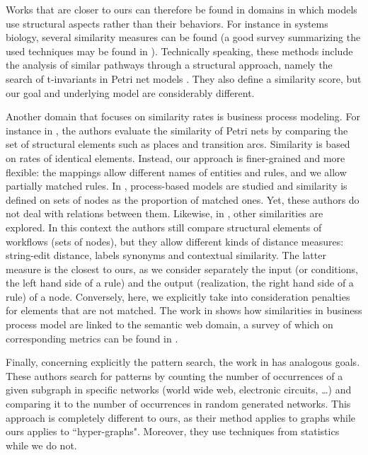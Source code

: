 \documentclass[a4paper,twoside]{article}
\begin{document}
Works that are closer to ours can therefore be found in domains in which models use structural aspects rather than their behaviors. 
For instance in systems biology, several similarity measures can be found (a good survey summarizing the used techniques may be found in \cite{bbw090}).   
Technically speaking, these methods include the analysis of similar pathways through a structural approach, namely the search of t-invariants in Petri net models \cite{Baldan2013ComparingMP, DBLP:journals/topnoc/BaldanCGS13, Grafahrend-Belau2008}.
They also define a similarity score, but our goal and underlying model are considerably different.

Another domain that focuses on similarity rates is business process modeling. For instance in \cite{xiao}, the authors evaluate the similarity of Petri nets by comparing the set of structural elements such as places and transition arcs. Similarity is based on rates of identical elements. 
Instead, our approach is finer-grained and more flexible: the mappings allow different names of entities and rules, and we allow partially matched rules.  
In \cite{bae}, process-based models are studied and similarity is defined on sets of nodes as the proportion of matched ones. 
Yet, these authors do not deal with relations between them. Likewise, in \cite{DIJKMAN2011498},  other similarities are explored. In this context the authors still compare structural elements of workflows (\eg sets of nodes), but they allow different kinds of distance measures: string-edit distance, labels synonyms and contextual similarity. 
The latter measure is the closest to ours, as we consider separately the input (or conditions, the left hand side of a rule) and the output (realization, the right hand side of a rule) of a node.  
Conversely, here, we explicitly take into consideration penalties for elements that are not matched. 
The work in \cite{DIJKMAN2011498} shows how similarities in business process model are linked to the semantic web domain, a survey of which on corresponding metrics can be found in \cite{Euzenat}.   


Finally, concerning explicitly the pattern search, the work in \cite{Milo824} has analogous goals. These authors search for patterns by counting the number of occurrences of a given subgraph in specific networks (world wide web, electronic circuits, \dots) and comparing it to the number of occurrences in random generated networks.  
This approach is completely  different to ours, as their method applies to graphs while ours applies to  ``hyper-graphs". Moreover, they use techniques from statistics while we do not.
\end{document}
